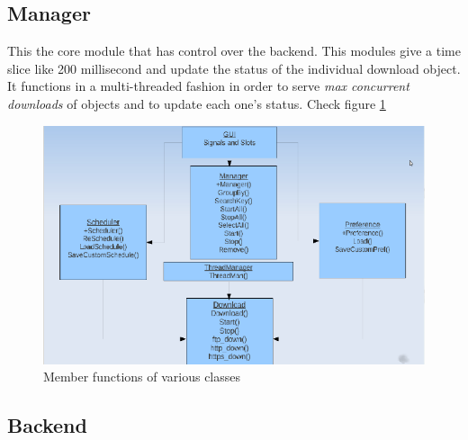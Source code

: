 \documentclass[pdftex,12pt,a4paper,pdfencoding=unicode]{article}
\begin{document}
\begin{onehalfspace}
       \subsection{Manager}
       This the core module that  has control over the backend. This modules give a time slice like 200 millisecond and update the status
       of the individual download object. It functions in a multi-threaded fashion in order to serve \emph{ max concurrent downloads } of
       objects and to update each one's status. Check figure \ref{fig:methods}
       \begin{figure}[h!]
         \includegraphics[scale=0.90]{pic/methods.png}
         \caption{Member functions of various classes \label{fig:methods}}
       \end{figure}

       \subsection{Backend}


\end{onehalfspace}
\end{document}
